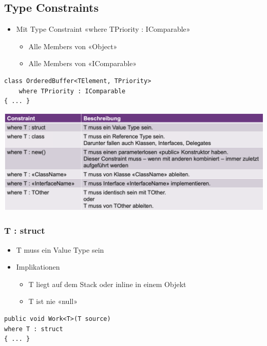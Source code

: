 \subsection{Type Constraints}
\begin{itemize}
    \item Mit Type Constraint «where TPriority : IComparable»
    \begin{itemize}
        \item Alle Members von «Object»
        \item Alle Members von «IComparable»
    \end{itemize}
\end{itemize}
\begin{lstlisting}
class OrderedBuffer<TElement, TPriority>
    where TPriority : IComparable
{ ... }
\end{lstlisting}

\vspace{-8pt}
\begin{center}
    \includegraphics[scale=.23]{graphic/generics/Type Constraints.png}
\end{center}
\vspace{-8pt}

\subsubsection{T : struct}
\begin{itemize}
    \item T muss ein Value Type sein
    \item Implikationen
    \begin{itemize}
        \item T liegt auf dem Stack oder inline in einem Objekt
        \item T ist nie «null»
    \end{itemize}
\end{itemize}
\begin{lstlisting}
public void Work<T>(T source)
where T : struct
{ ... }
\end{lstlisting}


